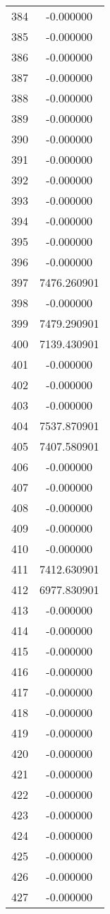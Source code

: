 \documentclass[12pt]{article}
\begin{document}
\begin{longtable}{@{}cc@{}}
384 & -0.000000 \\
385 & -0.000000 \\
386 & -0.000000 \\
387 & -0.000000 \\
388 & -0.000000 \\
389 & -0.000000 \\
390 & -0.000000 \\
391 & -0.000000 \\
392 & -0.000000 \\
393 & -0.000000 \\
394 & -0.000000 \\
395 & -0.000000 \\
396 & -0.000000 \\
397 & 7476.260901 \\
398 & -0.000000 \\
399 & 7479.290901 \\
400 & 7139.430901 \\
401 & -0.000000 \\
402 & -0.000000 \\
403 & -0.000000 \\
404 & 7537.870901 \\
405 & 7407.580901 \\
406 & -0.000000 \\
407 & -0.000000 \\
408 & -0.000000 \\
409 & -0.000000 \\
410 & -0.000000 \\
411 & 7412.630901 \\
412 & 6977.830901 \\
413 & -0.000000 \\
414 & -0.000000 \\
415 & -0.000000 \\
416 & -0.000000 \\
417 & -0.000000 \\
418 & -0.000000 \\
419 & -0.000000 \\
420 & -0.000000 \\
421 & -0.000000 \\
422 & -0.000000 \\
423 & -0.000000 \\
424 & -0.000000 \\
425 & -0.000000 \\
426 & -0.000000 \\
427 & -0.000000 \\

\end{longtable}
\end{document}
